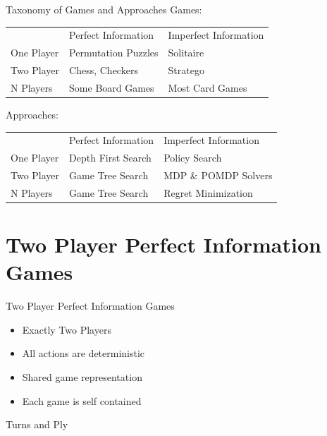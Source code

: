 \documentclass{powerdot}
\begin{document}
\begin{slide}{Taxonomy of Games and Approaches}
  Games:
  \begin{tabular}{lll}
               & Perfect Information & Imperfect Information \\
    One Player & Permutation Puzzles & Solitaire \\
    Two Player & Chess, Checkers     & Stratego \\
    N Players  & Some Board Games    & Most Card Games \\
  \end{tabular}
  \vspace{0.5in}
  Approaches:
  \begin{tabular}{lll}
               & Perfect Information & Imperfect Information \\
    One Player & Depth First Search & Policy Search \\
    Two Player & Game Tree Search   & MDP \& POMDP Solvers \\
    N Players  & Game Tree Search   & Regret Minimization \\
  \end{tabular}
\end{slide}

\section{Two Player Perfect Information Games}

\begin{slide}{Two Player Perfect Information Games}
  \begin{itemize}
    \item Exactly Two Players
    \item All actions are deterministic
    \item Shared game representation
    \item Each game is self contained
  \end{itemize}
\end{slide}

\begin{slide}{Turns and Ply}
\end{slide}
\end{document}
